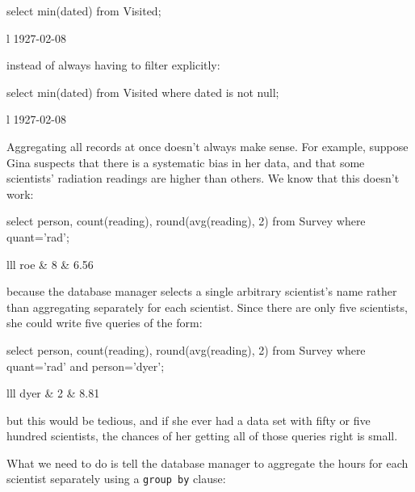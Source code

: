 \begin{VerbIn}
select min(dated) from Visited;
\end{VerbIn}

\begin{sqltable}{l}
1927-02-08 \\
\end{sqltable}

instead of always having to filter explicitly:

\begin{VerbIn}
select min(dated) from Visited where dated is not null;
\end{VerbIn}

\begin{sqltable}{l}
1927-02-08 \\
\end{sqltable}

Aggregating all records at once doesn't always make sense. For example,
suppose Gina suspects that there is a systematic bias in her data, and
that some scientists' radiation readings are higher than others. We know
that this doesn't work:

\begin{VerbIn}
select person, count(reading), round(avg(reading), 2)
from  Survey
where quant='rad';
\end{VerbIn}

\begin{sqltable}{lll}
roe & 8 & 6.56 \\
\end{sqltable}

because the database manager selects a single arbitrary scientist's name
rather than aggregating separately for each scientist. Since there are
only five scientists, she could write five queries of the form:

\begin{VerbIn}
select person, count(reading), round(avg(reading), 2)
from  Survey
where quant='rad'
and   person='dyer';
\end{VerbIn}

\begin{sqltable}{lll}
dyer & 2 & 8.81 \\
\end{sqltable}

but this would be tedious, and if she ever had a data set with fifty or
five hundred scientists, the chances of her getting all of those queries
right is small.

What we need to do is tell the database manager to aggregate the hours
for each scientist separately using a \texttt{group by} clause:

